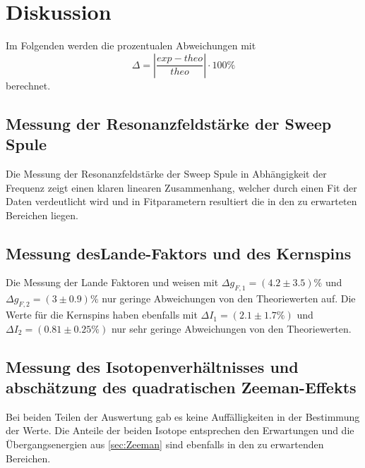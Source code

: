 \newpage
\section{Diskussion}
\label{sec:Diskussion}
Im Folgenden werden die prozentualen Abweichungen mit 
\begin{equation}\label{eq:1}
    \Delta = |\frac{exp - theo}{theo}|\cdot 100\%
\end{equation}
berechnet.
\subsection{Messung der Resonanzfeldstärke der Sweep Spule}
Die Messung der Resonanzfeldstärke der Sweep Spule in Abhängigkeit der Frequenz zeigt einen klaren linearen Zusammenhang, welcher durch einen Fit der Daten verdeutlicht wird und in Fitparametern resultiert die in den zu erwarteten Bereichen liegen. 
\subsection{Messung desLande-Faktors und des Kernspins}
Die Messung der Lande Faktoren und weisen mit $\Delta g_{F,1} = \left(  4.2 \pm 3.5 \right) \%$ und $\Delta g_{F,2} = \left(  3 \pm 0.9 \right) \%$ nur geringe Abweichungen von den Theoriewerten auf. Die Werte für die Kernspins haben ebenfalls mit 
$\Delta I_{1} = \left( 2.1 \pm 1.7 \% \right) $ und $\Delta I_{2} = \left(  0.81 \pm 0.25 \% \right)$ nur sehr geringe Abweichungen von den Theoriewerten.
\subsection{Messung des Isotopenverhältnisses und abschätzung des quadratischen Zeeman-Effekts}
Bei beiden Teilen der Auswertung gab es keine Auffälligkeiten in der Bestimmung der Werte. Die Anteile der beiden Isotope entsprechen den Erwartungen und die Übergangsenergien aus \autoref{sec:Zeeman} sind ebenfalls in den zu erwartenden Bereichen.
\newpage